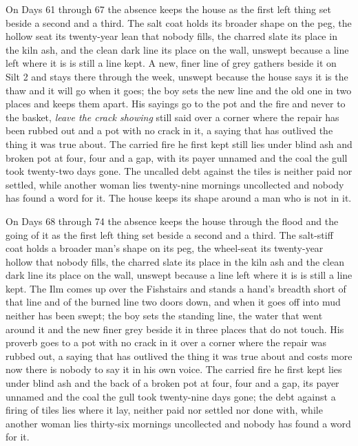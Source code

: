 \documentclass{design/chronicle}
\begin{document}
{On Days 61 through 67 the absence keeps the house as the first left thing set beside a second and a third. The salt coat holds its broader shape on the peg, the hollow seat its twenty-year lean that nobody fills, the charred slate its place in the kiln ash, and the clean dark line its place on the wall, unswept because a line left where it is is still a line kept. A new, finer line of grey gathers beside it on Silt 2 and stays there through the week, unswept because the house says it is the thaw and it will go when it goes; the boy sets the new line and the old one in two places and keeps them apart. His sayings go to the pot and the fire and never to the basket, \emph{leave the crack showing} still said over a corner where the repair has been rubbed out and a pot with no crack in it, a saying that has outlived the thing it was true about. The carried fire he first kept still lies under blind ash and broken pot at four, four and a gap, with its payer unnamed and the coal the gull took twenty-two days gone. The uncalled debt against the tiles is neither paid nor settled, while another woman lies twenty-nine mornings uncollected and nobody has found a word for it. The house keeps its shape around a man who is not in it.

On Days 68 through 74 the absence keeps the house through the flood and the going of it as the first left thing set beside a second and a third. The salt-stiff coat holds a broader man’s shape on its peg, the wheel-seat its twenty-year hollow that nobody fills, the charred slate its place in the kiln ash and the clean dark line its place on the wall, unswept because a line left where it is is still a line kept. The Ilm comes up over the Fishstairs and stands a hand’s breadth short of that line and of the burned line two doors down, and when it goes off into mud neither has been swept; the boy sets the standing line, the water that went around it and the new finer grey beside it in three places that do not touch. His proverb goes to a pot with no crack in it over a corner where the repair was rubbed out, a saying that has outlived the thing it was true about and costs more now there is nobody to say it in his own voice. The carried fire he first kept lies under blind ash and the back of a broken pot at four, four and a gap, its payer unnamed and the coal the gull took twenty-nine days gone; the debt against a firing of tiles lies where it lay, neither paid nor settled nor done with, while another woman lies thirty-six mornings uncollected and nobody has found a word for it.

}
\end{document}
